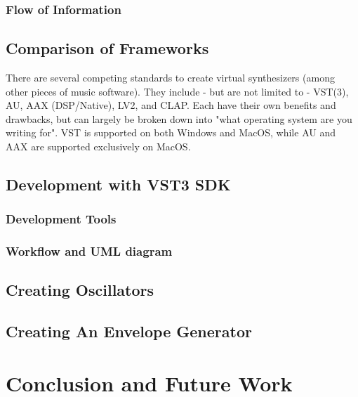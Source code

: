 \documentclass[12pt]{article}
\begin{document}
\subsubsection{Flow of Information}



\subsection{Comparison of Frameworks}
There are several competing standards to create virtual synthesizers (among other pieces of music software). They include - but are not limited to - VST(3), AU, AAX (DSP/Native), LV2, and CLAP. Each have their own benefits and drawbacks, but can largely be broken down into "what operating system are you writing for". VST is supported on both Windows and MacOS, while AU and AAX are supported exclusively on MacOS. 

\subsection{Development with VST3 SDK}

\subsubsection{Development Tools}

\subsubsection{Workflow and UML diagram}

\subsection{Creating Oscillators}

\subsection{Creating An Envelope Generator}

\section{Conclusion and Future Work}




\end{document}
